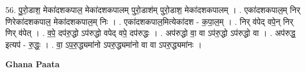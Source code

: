 \documentclass[17pt]{extarticle}
\begin{document}
56. पु॒रो॒डाश॒ मेका॑दशकपाल॒ मेका॑दशकपालम् पुरो॒डाश॑म् पुरो॒डाश॒ मेका॑दशकपालम् । . एका॑दशकपाल॒म् निर् णिरेका॑दशकपाल॒ मेका॑दशकपाल॒म् निः । . एका॑दशकपाल॒मित्येका॑दश - क॒पा॒ल॒म् । . निर् व॑पेद् वपे॒न् निर् णिर् व॑पेत् । . व॒पे॒ दप॑रु॒द्धो ऽप॑रुद्धो वपेद् वपे॒ दप॑रुद्धः । . अप॑रुद्धो वा॒ वा ऽप॑रु॒द्धो ऽप॑रुद्धो वा । . अप॑रुद्ध॒ इत्यप॑ - रु॒द्धः॒ । . वा॒ ऽप॒रु॒द्ध्यमा॑नो ऽपरु॒द्ध्यमा॑नो वा वा ऽपरु॒द्ध्यमा॑नः । \newline

\textbf{Ghana Paata } \newline
\end{document}

